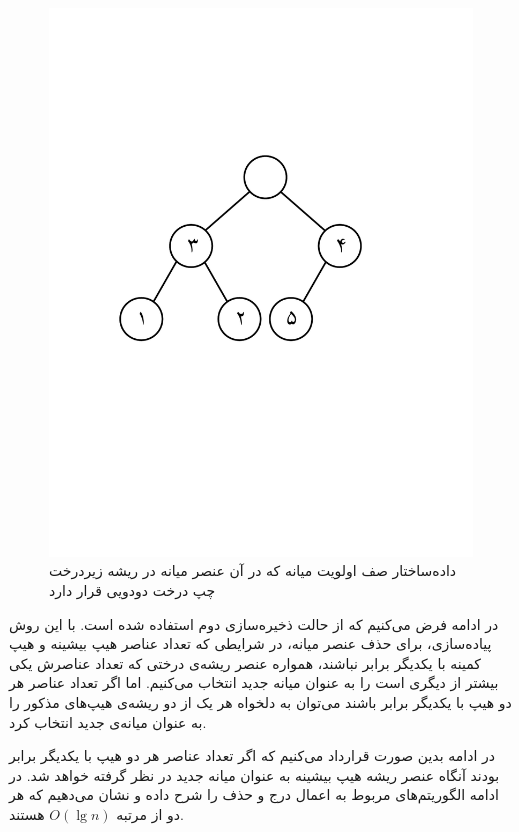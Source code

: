 \begin{figure}
\begin{center}
\includegraphics[scale=0.36]{figs/ch5/median_priority_queue_2.pdf}
\caption{داده‌ساختار صف اولویت میانه که در آن عنصر میانه در ریشه زیردرخت چپ درخت دودویی قرار دارد}\label{ch5:fig:medPrioQueue2}
\end{center}
\end{figure}

در ادامه فرض می‌کنیم که از حالت ذخیره‌سازی دوم استفاده شده است. با این روش پیاده‌سازی، برای حذف عنصر میانه، در شرایطی که تعداد عناصر هیپ بیشینه و هیپ کمینه با یکدیگر برابر نباشند، همواره عنصر ریشه‌ی درختی که تعداد عناصرش یکی بیشتر از دیگری است را به عنوان میانه جدید انتخاب می‌کنیم. اما اگر تعداد عناصر هر دو هیپ با یکدیگر برابر باشند می‌توان به دلخواه هر یک از دو ریشه‌ی هیپ‌های مذکور را به عنوان میانه‌ی جدید انتخاب کرد. 

در ادامه بدین صورت قرارداد می‌کنیم که اگر تعداد عناصر هر دو هیپ با یکدیگر برابر بودند آنگاه عنصر ریشه هیپ بیشینه به عنوان میانه جدید در نظر گرفته خواهد شد. در ادامه الگوریتم‌های مربوط به اعمال درج و حذف را شرح داده و نشان می‌دهیم که هر دو از مرتبه {$O(\lg n)$} هستند.

